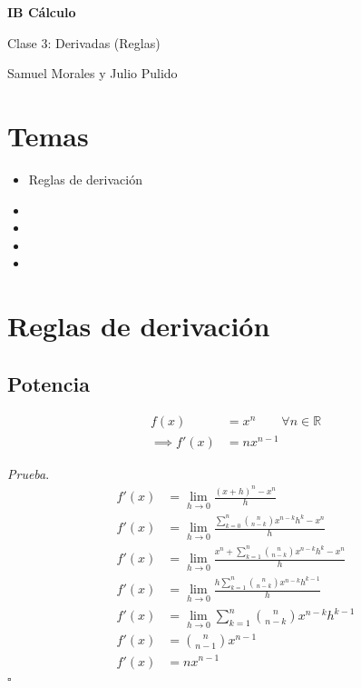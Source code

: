\documentclass[spanish,12pt]{article}
\begin{document}
	\begin{titlepage}
	\begin{center}
	\hspace{0pt}
	\vfill
	{\Large\textbf{{IB Cálculo}}}
	
	\medskip
	Clase 3: Derivadas (Reglas)
	
	\medskip
    Samuel Morales y Julio Pulido
	
	\thispagestyle{empty}
	\vfill
	\end{center}
	\end{titlepage}
\newpage
\tableofcontents
\newpage
\section{Temas}
\begin{itemize}
    \item Reglas de derivación
    \item 
    \item 
    \item 
    \item 
\end{itemize}
\section{Reglas de derivación}
\subsection{Potencia}
\begin{align*}
    f(x)&=x^n \quad \quad \forall n\in \mathbb{R}\\
    \implies f'(x)&=nx^{n-1}
\end{align*}

\textit{Prueba}.
\begin{align*}
    f'(x)&=\lim_{h\to0}{\frac{(x+h)^n-x^n}{h}}\\
    f'(x)&=\lim_{h\to0}{\frac{\sum\limits_{k=0}^{n}{\binom{n}{n-k}}x^{n-k}h^{k}-x^n}{h}}\\
    f'(x)&=\lim_{h\to0}{\frac{x^n+\sum\limits_{k=1}^{n}{\binom{n}{n-k}}x^{n-k}h^{k}-x^n}{h}}\\
    f'(x)&=\lim_{h\to0}{\frac{h\sum\limits_{k=1}^{n}{\binom{n}{n-k}}x^{n-k}h^{k-1}}{h}}\\
    f'(x)&=\lim_{h\to0}{\sum\limits_{k=1}^{n}{\binom{n}{n-k}}x^{n-k}h^{k-1}}\\
    f'(x)&=\binom{n}{n-1}x^{n-1}\\
    f'(x)&=nx^{n-1}\\
\end{align*}
\hfill $\square$
\end{document}
